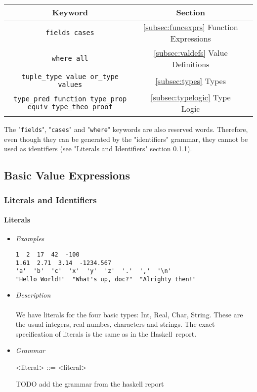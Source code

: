 \documentclass{article}
\def\H{Haskell}
\begin{document}
\begin{center}
\begin{tabular}{ |c|c|c| } 
\hline
Keyword & Section \\ 
\hline
\hline
\texttt{fields cases} & \ref{subsec:funcexprs} Function Expressions \\
\hline
\texttt{where all} & \ref{subsec:valdefs} Value Definitions \\
\hline
\texttt{tuple_type value or_type values} & \ref{subsec:types} Types \\
\hline
\texttt{type_pred function type_prop equiv type_theo proof} &
  \ref{subsec:typelogic} Type Logic \\
\hline
\end{tabular}
\end{center}
The "\texttt{fields}", "\texttt{cases}" and "\texttt{where}" keywords are also
reserved words. Therefore, even though they can be generated by the
"identifiers" grammar, they cannot be used as identifiers (see "Literals and
Identifiers" section \ref{subsubsec:litsandidents}).

\subsection{Basic Value Expressions}

\subsubsection{Literals and Identifiers}
\label{subsubsec:litsandidents}

\paragraph{Literals}
\begin{itemize}

\item \textit{Examples}
\begin{verbatim}
1  2  17  42  -100
1.61  2.71  3.14  -1234.567
'a'  'b'  'c'  'x'  'y'  'z'  '.'  ','  '\n'
"Hello World!"  "What's up, doc?"  "Alrighty then!"
\end{verbatim}

\item \textit{Description} \\\\
We have literals for the four basic types: Int, Real, Char, String. These are the 
usual integers, real numbes, characters and strings. The exact specification of 
literals is the same as in the \H\ report.

\item \textit{Grammar}
\begin{grammar}
<literal> ::= <literal>
\end{grammar}
TODO add the grammar from the haskell report

\end{itemize}
\end{document}

